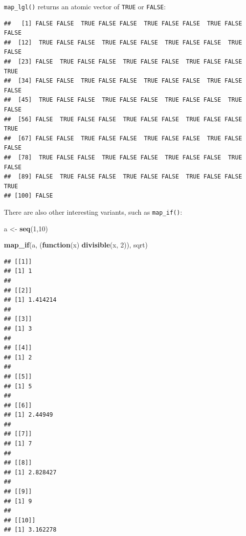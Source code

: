 \documentclass[]{gitbook}
\newenvironment{Shaded}{\begin{snugshade}}{\end{snugshade}}
\newcommand{\ControlFlowTok}[1]{\textcolor[rgb]{0.13,0.29,0.53}{\textbf{#1}}}
\newcommand{\DecValTok}[1]{\textcolor[rgb]{0.00,0.00,0.81}{#1}}
\newcommand{\KeywordTok}[1]{\textcolor[rgb]{0.13,0.29,0.53}{\textbf{#1}}}
\newcommand{\NormalTok}[1]{#1}
\newcommand{\OperatorTok}[1]{\textcolor[rgb]{0.81,0.36,0.00}{\textbf{#1}}}
\newcommand{\OtherTok}[1]{\textcolor[rgb]{0.56,0.35,0.01}{#1}}
\newcommand{\StringTok}[1]{\textcolor[rgb]{0.31,0.60,0.02}{#1}}
\begin{document}
\texttt{map\_lgl()} returns an atomic vector of \texttt{TRUE} or \texttt{FALSE}:

\begin{Shaded}
\end{Shaded}

\begin{verbatim}
##   [1] FALSE FALSE  TRUE FALSE FALSE  TRUE FALSE FALSE  TRUE FALSE FALSE
##  [12]  TRUE FALSE FALSE  TRUE FALSE FALSE  TRUE FALSE FALSE  TRUE FALSE
##  [23] FALSE  TRUE FALSE FALSE  TRUE FALSE FALSE  TRUE FALSE FALSE  TRUE
##  [34] FALSE FALSE  TRUE FALSE FALSE  TRUE FALSE FALSE  TRUE FALSE FALSE
##  [45]  TRUE FALSE FALSE  TRUE FALSE FALSE  TRUE FALSE FALSE  TRUE FALSE
##  [56] FALSE  TRUE FALSE FALSE  TRUE FALSE FALSE  TRUE FALSE FALSE  TRUE
##  [67] FALSE FALSE  TRUE FALSE FALSE  TRUE FALSE FALSE  TRUE FALSE FALSE
##  [78]  TRUE FALSE FALSE  TRUE FALSE FALSE  TRUE FALSE FALSE  TRUE FALSE
##  [89] FALSE  TRUE FALSE FALSE  TRUE FALSE FALSE  TRUE FALSE FALSE  TRUE
## [100] FALSE
\end{verbatim}

There are also other interesting variants, such as \texttt{map\_if()}:

\begin{Shaded}
\begin{Highlighting}[]
\NormalTok{a <-}\StringTok{ }\KeywordTok{seq}\NormalTok{(}\DecValTok{1}\NormalTok{,}\DecValTok{10}\NormalTok{)}

\KeywordTok{map_if}\NormalTok{(a, (}\ControlFlowTok{function}\NormalTok{(x) }\KeywordTok{divisible}\NormalTok{(x, }\DecValTok{2}\NormalTok{)), sqrt)}
\end{Highlighting}
\end{Shaded}

\begin{verbatim}
## [[1]]
## [1] 1
## 
## [[2]]
## [1] 1.414214
## 
## [[3]]
## [1] 3
## 
## [[4]]
## [1] 2
## 
## [[5]]
## [1] 5
## 
## [[6]]
## [1] 2.44949
## 
## [[7]]
## [1] 7
## 
## [[8]]
## [1] 2.828427
## 
## [[9]]
## [1] 9
## 
## [[10]]
## [1] 3.162278
\end{verbatim}
\end{document}
